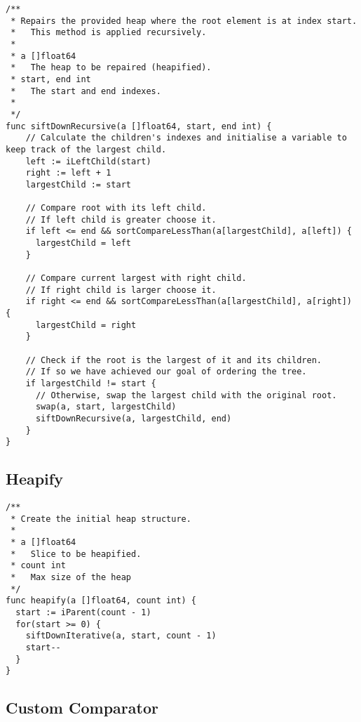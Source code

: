 \documentclass{article}
\begin{document}
\begin{lstlisting}[language=Golang, caption=The procedure which restores the properties of the heap following the removal of the root node. This implementation is functionally the same as its iterative counterpart.]
/**
 * Repairs the provided heap where the root element is at index start.
 *   This method is applied recursively.
 *
 * a []float64
 *   The heap to be repaired (heapified).
 * start, end int
 *   The start and end indexes.
 *
 */
func siftDownRecursive(a []float64, start, end int) {
    // Calculate the children's indexes and initialise a variable to keep track of the largest child.
    left := iLeftChild(start)
    right := left + 1
    largestChild := start

    // Compare root with its left child.
    // If left child is greater choose it.
    if left <= end && sortCompareLessThan(a[largestChild], a[left]) {
      largestChild = left
    }

    // Compare current largest with right child.
    // If right child is larger choose it.
    if right <= end && sortCompareLessThan(a[largestChild], a[right]) {
      largestChild = right
    }

    // Check if the root is the largest of it and its children.
    // If so we have achieved our goal of ordering the tree.
    if largestChild != start {
      // Otherwise, swap the largest child with the original root.
      swap(a, start, largestChild)
      siftDownRecursive(a, largestChild, end)
    }
}
\end{lstlisting}

\subsection{Heapify}

\begin{lstlisting}[language=Golang, caption=Method used to convert the given list of elements into a complete binary heap.]
/**
 * Create the initial heap structure.
 *
 * a []float64
 *   Slice to be heapified.
 * count int
 *   Max size of the heap
 */
func heapify(a []float64, count int) {
  start := iParent(count - 1)
  for(start >= 0) {
    siftDownIterative(a, start, count - 1)
    start--
  }
}
\end{lstlisting}

\subsection{Custom Comparator}
\end{document}
